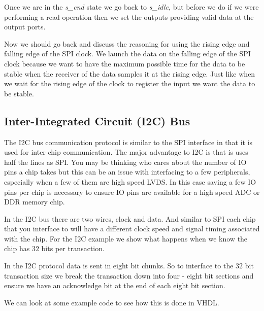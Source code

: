 Once we are in the \emph{s\_end} state we go back to \emph{s\_idle}, but before we do if we were performing a read operation then we set the outputs providing valid data at the output ports. 

Now we should go back and discuss the reasoning for using the rising edge and falling edge of the \ac{SPI} clock. We launch the data on the falling edge of the \ac{SPI} clock because we want to have the maximum possible time for the data to be stable when the receiver of the data samples it at the rising edge. Just like when we wait for the rising edge of the clock to register the input we want the data to be stable. 

\subsection{Inter-Integrated Circuit (I2C) Bus}

The \ac{I2C} bus communication protocol is similar to the \ac{SPI} interface in that it is used for inter chip communication. The major advantage to \ac{I2C} is that is uses half the lines as \ac{SPI}. You may be thinking who cares about the number of \ac{IO} pins a chip takes but this can be an issue with interfacing to a few peripherals, especially when a few of them are high speed \ac{LVDS}. In this case saving a few \ac{IO} pins per chip is necessary to ensure \ac{IO} pins are available for a high speed \ac{ADC} or \ac{DDR} memory chip. 	
	
In the \ac{I2C} bus there are two wires, clock and data. And similar to \ac{SPI} each chip that you interface to will have a different clock speed and signal timing associated with the chip. For the \ac{I2C} example we show what happens when we know the chip has $32$ bits per transaction. 	
	
In the \ac{I2C} protocol data is sent in eight bit chunks. So to interface to the $32$ bit transaction size we break the transaction down into four - eight bit sections and ensure we have an acknowledge bit at the end of each eight bit section. 
	
We can look at some example code to see how this is done in \ac{VHDL}.	

